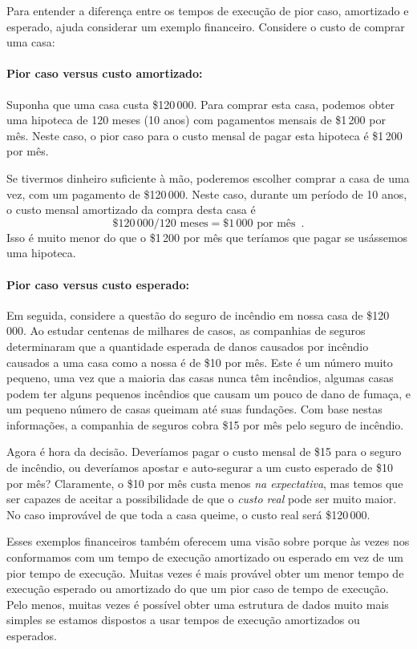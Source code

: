 Para entender a diferença entre os tempos de execução de pior caso, amortizado e esperado,
 ajuda considerar um exemplo financeiro. Considere o custo de comprar uma casa:
\paragraph{Pior caso versus custo amortizado:}
%
Suponha que uma casa custa \$120\,000. Para comprar esta casa, podemos obter uma hipoteca 
de 120 meses (10 anos) com pagamentos mensais de \$1\,200 por mês. Neste caso, o pior caso para o custo mensal de pagar esta hipoteca é \$1\,200 por mês.

Se tivermos dinheiro suficiente à mão, poderemos escolher comprar a casa de uma vez, com um pagamento de \$120\,000. Neste caso, durante um período de 10 anos, o custo mensal amortizado da compra desta casa é
\[
\$120\,000 / 120\text{ meses} = \$1\,000\text{ por mês} \enspace .
\]
Isso é muito menor do que o  \$1\,200 por mês que teríamos que pagar se 
usássemos uma hipoteca.

\paragraph{Pior caso versus custo esperado:}
%
Em seguida, considere a questão do seguro de incêndio em nossa casa de \$120\,000.
Ao estudar centenas de milhares de casos, as companhias de seguros determinaram que a 
quantidade esperada de danos causados por incêndio causados a uma casa como a nossa é 
de \$10 por mês. Este é um número muito pequeno, uma vez que a maioria das casas nunca 
têm incêndios, algumas casas podem ter alguns pequenos incêndios que causam um pouco 
de dano de fumaça, e um pequeno número de casas queimam até suas fundações. Com base 
nestas informações, a companhia de seguros cobra \$15 por mês pelo seguro de incêndio.

Agora é hora da decisão. Deveríamos pagar o custo mensal de \$15 para o seguro de incêndio, 
ou deveríamos apostar e auto-segurar a um custo esperado de \$10 por mês? 
Claramente, o \$10 por mês custa menos \emph{na expectativa}, mas temos que ser capazes 
de aceitar a possibilidade de que o \emph{custo real} pode ser muito maior. No caso 
improvável de que toda a casa queime, o custo real será \$120\,000.

Esses exemplos financeiros também oferecem uma visão sobre porque às vezes nos conformamos 
com um tempo de execução amortizado ou esperado em vez de  um pior tempo de execução.
Muitas vezes é mais provável obter um menor tempo de execução esperado ou amortizado do que 
um pior caso de tempo de execução. Pelo menos, muitas vezes é possível obter uma estrutura 
de dados muito mais simples se estamos dispostos a usar tempos de execução amortizados 
ou esperados.

